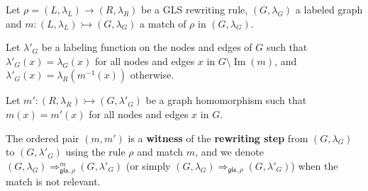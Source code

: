 \begin{definition}
  \label{def:gls_witness_rewriting_step}
  Let \( \rho = (L, \lambda_L) \to (R,\lambda_R) \) be a GLS rewriting rule, \( (G, \lambda_G) \) a labeled graph and \( m : (L, \lambda_L) \rightarrowtail (G,\lambda_G) \) a match of \( \rho \) in \( (G, \lambda_G) \).
  
  Let $\lambda'_G$ be a labeling function on the nodes and edges of \( G \) such that \( \lambda'_G(x) = \lambda_G(x) \) for all nodes and edges \( x \) in \( G \setminus \operatorname{Im}(m) \), and \( \lambda'_G(x) = \lambda_R(m^{-1}(x)) \) otherwise.

  Let $m' : (R, \lambda_R) \rightarrowtail (G, \lambda'_G)$ be a graph homomorphism such that \( m(x) = m'(x) \) for all nodes and edges \( x \) in \( G \).

  The ordered pair $(m, m')$ is a \textbf{witness} of the \textbf{rewriting step} from \( (G, \lambda_G) \) to \( (G, \lambda'_G) \) using the rule \( \rho \) and match \( m \), and we denote $(G,\lambda_G) \Rightarrow_{\mathfrak{gls},\rho}^m (G,\lambda'_G)$ (or simply \( (G,\lambda_G) \Rightarrow_{\mathfrak{gls},\rho} (G,\lambda'_G) \)) when the match is not relevant.
\end{definition}




